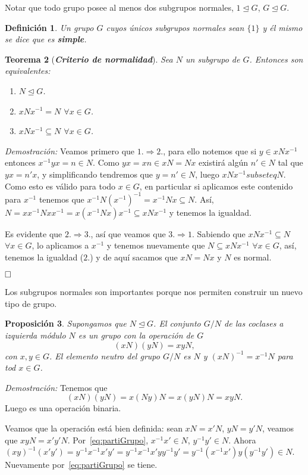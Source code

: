 \documentclass[12pt]{article}
\newtheorem{theorem}{Teorema}[section]
\newtheorem{proposition}[theorem]{Proposición}
\newtheorem{definition}[theorem]{Definición}
\begin{document}
Notar que todo grupo posee al menos dos subgrupos normales, $1 \unlhd G$, $G \unlhd G$.

\begin{definition} Un grupo $G$ cuyos únicos subgrupos normales sean $\lbrace 1 \rbrace$ y él mismo se dice que es \textbf{simple}.
\end{definition}

\begin{theorem}[\textbf{\textit{Criterio de normalidad}}]
Sea $N$ un subgrupo de $G$. Entonces son equivalentes:
\begin{enumerate}
\item $N\unlhd G$.
\item $xN x^{-1} = N$ $\forall x \in G$.
\item $xNx^{-1} \subseteq N$ $\forall x \in G$.
\end{enumerate}
\end{theorem}
\emph{Demostración: }Veamos primero que $1.\Rightarrow 2.$, para ello notemos que si $y\in xNx^{-1}$ entonces $x^{-1}yx = n \in N$. Como $yx = xn \in xN = Nx$ existirá algún $n' \in N$ tal que $yx = n'x$, y simplificando tendremos que $y = n' \in N$, luego $xNx^{-1} subseteq N$. Como esto es válido para todo $x \in G$, en particular si aplicamos este contenido para $x^{-1}$ tenemos que $x^{-1}N(x^{-1})^{-1}= x^{-1}Nx \subseteq N$. Así, $N = xx^{-1}Nxx^{-1} = x(x^{-1}Nx)x^{-1} \subseteq xNx^{-1}$ y tenemos la igualdad. 

Es evidente que $2.\Rightarrow 3.$, así que veamos que $3.\Rightarrow 1.$ Sabiendo que $xNx^{-1} \subseteq N$ $\forall x\in G$, lo aplicamos a $x^{-1}$ y tenemos nuevamente que $N \subseteq xNx^{-1}$ $\forall x \in G$, así, tenemos la igualdad ($2.$) y de aquí sacamos que $xN = Nx$ y $N$ es normal.

$\hfill \square$

Los subgrupos normales son importantes porque nos permiten construir un nuevo tipo de grupo.

\begin{proposition}Supongamos que $N \unlhd G$. El conjunto $G/N$ de las coclases a izquierda módulo $N$ es un grupo con la operación de $G$ 
$$(xN)(yN)=xyN,$$ con $x,y \in G$. El elemento neutro del grupo $G/N$ es $N$ y $(xN)^{-1} = x^{-1}N$ para tod $x \in G$.
\end{proposition}
\emph{Demostración: }Tenemos que $$(xN)(yN)=x(Ny)N = x(yN)N = xyN.$$ Luego es una operación binaria. 

Veamos que la operación está bien definida: sean $xN = x'N$, $yN = y'N$, veamos que $xyN = x'y'N$. Por~\ref{eq:partiGrupo}, $x^{-1}x' \in N$, $y^{-1}y' \in N$. Ahora $(xy)^{-1}(x'y') = y^{-1}x^{-1}x'y' = y^{-1}x^{-1}x'yy^{-1}y'=y^{-1}(x^{-1}x')y(y^{-1}y') \in N$. Nuevamente por~\ref{eq:partiGrupo} se tiene.
\end{document}

